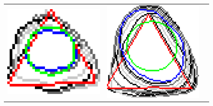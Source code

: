 \begin{figure}
\begin{tabular}{ccc}
\includegraphics[scale=0.25]{figures/chapter5/flow/triangle/radius_3/mdca/elastica/len_pen_0.01000/jonctions_1/best/gs_1.00000/summary.pdf} &
\includegraphics[scale=0.25]{figures/chapter5/flow/triangle/radius_3/mdca/elastica/len_pen_0.01000/jonctions_1/best/gs_0.50000/summary.pdf} &

\end{tabular}
\end{figure}

